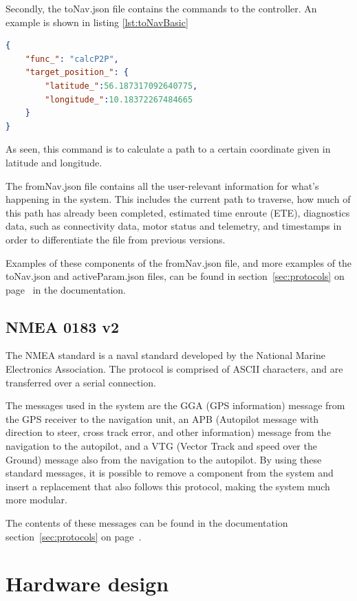Secondly, the toNav.json file contains the commands to the controller. An example is shown in listing \ref{lst:toNavBasic}

\begin{lstlisting}[caption = {Example of a calcP2P call in the toNav.JSON}, captionpos=b, label={lst:toNavCalcP2P}, language=json,firstnumber=1]
{
	"func_": "calcP2P",
	"target_position_": {
		"latitude_":56.187317092640775,
		"longitude_":10.18372267484665
	}
}
\end{lstlisting}

As seen, this command is to calculate a path to a certain coordinate given in latitude and longitude. 

The fromNav.json file contains all the user-relevant information for what's happening in the system. This includes the current path to traverse, how much of this path has already been completed, estimated time enroute (ETE), diagnostics data, such as connectivity data, motor status and telemetry, and timestamps in order to differentiate the file from previous versions.

 Examples of these components of the fromNav.json file, and more examples of the toNav.json and activeParam.json files, can be found in section~\ref{sec:protocols} on page~\pageref{sec:protocols} in the documentation.

\subsection{NMEA 0183 v2}

The NMEA standard is a naval standard developed by the National Marine Electronics Association. The protocol is comprised of ASCII characters, and are transferred over a serial connection. 

The messages used in the system are the GGA (GPS information) message from the GPS receiver to the navigation unit, an APB (Autopilot message with direction to steer, cross track error, and other information) message from the navigation to the autopilot, and a VTG (Vector Track and speed over the Ground) message also from the navigation to the autopilot. By using these standard messages, it is possible to remove a component from the system and insert a replacement that also follows this protocol, making the system much more modular.

The contents of these messages can be found in the documentation section~\ref{sec:protocols} on page~\pageref{sec:protocols}. 

\section{Hardware design}

